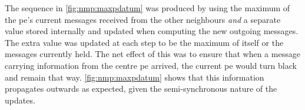 The sequence in \cref{fig:nmp:maxpdatum} was produced by using the maximum of the \gls{pe}'s current messages received from the other neighbours \emph{and} a separate value stored internally and updated when computing the new outgoing messages.  The extra value was updated at each step to be the maximum of itself or the messages currently held.  The net effect of this was to ensure that when a message carrying information from the centre \gls{pe} arrived, the current \gls{pe} would turn black and remain that way.  \cref{fig:nmp:maxpdatum} shows that this information propagates outwards as expected, given the semi-synchronous nature of the updates.

\begin{figure}
    \centering

\end{figure}
